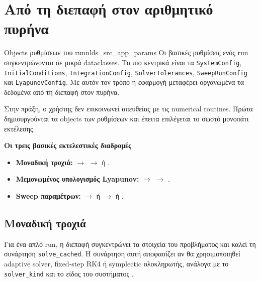 \section{Από τη διεπαφή στον αριθμητικό πυρήνα}
\label{sec:ch2-ui-to-core}

\begin{definitionbox}{Objects ρυθμίσεων του run}{nlds_src_app_params}
Οι βασικές ρυθμίσεις ενός run συγκεντρώνονται σε μικρά dataclasses. Τα πιο
κεντρικά είναι τα \texttt{SystemConfig}, \texttt{InitialConditions},
\texttt{IntegrationConfig}, \texttt{SolverTolerances},
\texttt{SweepRunConfig} και \texttt{LyapunovConfig}. Με αυτόν τον τρόπο η
εφαρμογή μεταφέρει οργανωμένα τα δεδομένα από τη διεπαφή στον πυρήνα.
\end{definitionbox}

Στην πράξη, ο χρήστης δεν επικοινωνεί απευθείας με τις numerical routines.
Πρώτα δημιουργούνται τα objects των ρυθμίσεων και έπειτα επιλέγεται το σωστό
μονοπάτι εκτέλεσης.

\begin{importantbox}
\textbf{Οι τρεις βασικές εκτελεστικές διαδρομές}

\begin{itemize}
\item \textbf{Μοναδική τροχιά:}
\(\rightarrow\)
\(\rightarrow\)
 ή .
\item \textbf{Μεμονωμένος υπολογισμός Lyapunov:}
\(\rightarrow\)
\(\rightarrow\)
.
\item \textbf{Sweep παραμέτρων:}
\(\rightarrow\)
 ή 
\(\rightarrow\)
 ή .
\end{itemize}
\end{importantbox}

\subsection{Μοναδική τροχιά}
\label{subsec:ch2-single-run-path}

Για ένα απλό run, η διεπαφή συγκεντρώνει τα στοιχεία του προβλήματος και
καλεί τη συνάρτηση \texttt{solve\_cached}. Η συνάρτηση αυτή αποφασίζει αν θα
χρησιμοποιηθεί adaptive solver, fixed-step RK4 ή symplectic ολοκληρωτής,
ανάλογα με το \texttt{solver\_kind} και το είδος του συστήματος
\cite{nlds_src_app_cache,nlds_src_core_solver,nlds_src_core_symplectic}.

